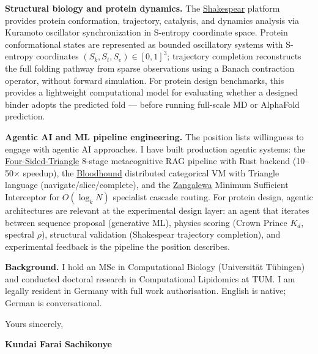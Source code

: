 \documentclass[12pt,a4paper]{article}
\begin{document}
\textbf{Structural biology and protein dynamics.}
The \href{https://shakespear-nine.vercel.app/instrument}{Shakespear}
platform provides protein conformation, trajectory, catalysis, and dynamics
analysis via Kuramoto oscillator synchronization in S-entropy coordinate space.
Protein conformational states are represented as bounded oscillatory systems
with S-entropy coordinates $(S_k, S_t, S_e) \in [0,1]^3$; trajectory
completion reconstructs the full folding pathway from sparse observations
using a Banach contraction operator, without forward simulation.
For protein design benchmarks, this provides a lightweight computational
model for evaluating whether a designed binder adopts the predicted
fold --- before running full-scale MD or AlphaFold prediction.

\textbf{Agentic AI and ML pipeline engineering.}
The position lists willingness to engage with agentic AI approaches.
I have built production agentic systems: the
\href{https://github.com/fullscreen-triangle/four-sided-triangle}{Four-Sided-Triangle}
8-stage metacognitive RAG pipeline with Rust backend (10--50$\times$ speedup),
the \href{https://github.com/fullscreen-triangle/bloodhound}{Bloodhound}
distributed categorical VM with Triangle language (navigate/slice/complete),
and the \href{https://github.com/fullscreen-triangle/zangalewa}{Zangalewa}
Minimum Sufficient Interceptor for $O(\log_k N)$ specialist cascade routing.
For protein design, agentic architectures are relevant at the experimental design
layer: an agent that iterates between sequence proposal (generative ML),
physics scoring (Crown Prince $K_d$, spectral $\rho$), structural validation
(Shakespear trajectory completion), and experimental feedback is the pipeline
the position describes.

\textbf{Background.}
I hold an MSc in Computational Biology (Universität Tübingen) and conducted
doctoral research in Computational Lipidomics at TUM. I am legally resident
in Germany with full work authorisation. English is native; German is
conversational.

\vspace{1.5em}
Yours sincerely,

\vspace{2.5em}
\textbf{Kundai Farai Sachikonye}
\end{document}
